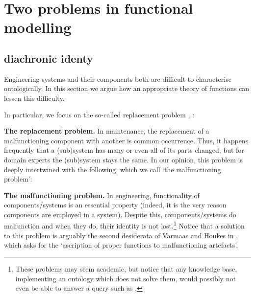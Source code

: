 \documentclass[
]{ceurart}
\begin{document}
\section{Two problems in functional modelling}

\subsection{diachronic identy}\label{subsec:identity}
Engineering systems and their components both are difficult to characterise ontologically. %
In this section we argue how an appropriate theory of functions can lessen this difficulty.%

In particular, we focus on the so-called replacement problem \cite{guarinoArtefactualSystemsMissing2014},  \cite[Chapter 14]{westDevelopingHighQuality2011}:
\bflist
\item[\mypb{replacement}] \textbf{The replacement problem.} In maintenance, the replacement of a malfunctioning component
with another is common occurrence. Thus, it happens frequently that a (sub)system has many or even all of its parts changed, but for domain experts the (sub)system stays the same. 
\eflist
In our opinion, this problem is deeply intertwined with the following, which we call `the malfunctioning problem':
\bflist
\item[\mypb{malfunctioning}] \textbf{The malfunctioning problem.} In engineering, functionality of components/systems is an essential property (indeed, it is the very reason components are employed in a system). Despite this, components/systems do malfunction and when they do, their identity is not lost.\footnote{These problems may seem academic, but notice that any knowledge base, implementing an ontology which does not solve them, would possibly not even be able to answer a query such as .} 
\eflist 
Notice that a solution to this problem is arguably the second desiderata of Varmaas and Houkes in \cite{vermaasAscribingFunctionsTechnical2003}, which asks for the `ascription of proper functions to malfunctioning artefacts'.
\end{document}
